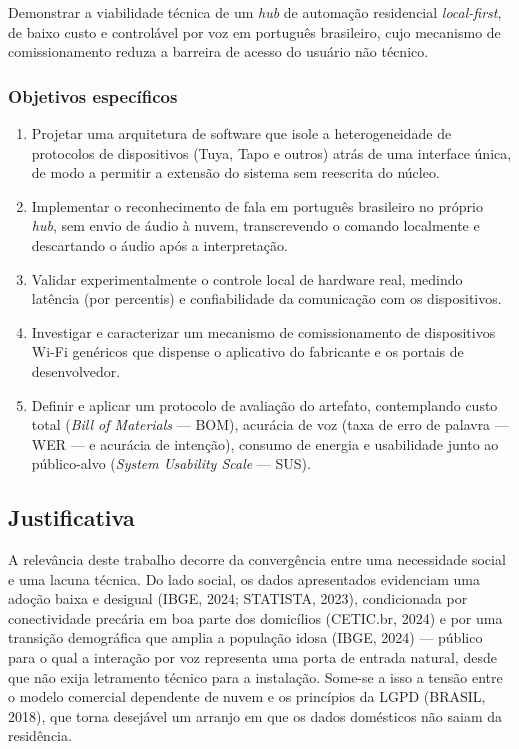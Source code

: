 Demonstrar a viabilidade técnica de um \textit{hub} de automação residencial
\textit{local-first}, de baixo custo e controlável por voz em português brasileiro,
cujo mecanismo de comissionamento reduza a barreira de acesso do usuário não técnico.

\subsubsection{Objetivos específicos}

\begin{enumerate}
  \item Projetar uma arquitetura de software que isole a heterogeneidade de protocolos
        de dispositivos (Tuya, Tapo e outros) atrás de uma interface única, de modo a
        permitir a extensão do sistema sem reescrita do núcleo.
  \item Implementar o reconhecimento de fala em português brasileiro no próprio
        \textit{hub}, sem envio de áudio à nuvem, transcrevendo o comando localmente e
        descartando o áudio após a interpretação.
  \item Validar experimentalmente o controle local de hardware real, medindo latência
        (por percentis) e confiabilidade da comunicação com os dispositivos.
  \item Investigar e caracterizar um mecanismo de comissionamento de dispositivos
        Wi-Fi genéricos que dispense o aplicativo do fabricante e os portais de
        desenvolvedor.
  \item Definir e aplicar um protocolo de avaliação do artefato, contemplando custo
        total (\textit{Bill of Materials} --- BOM), acurácia de voz (taxa de erro de
        palavra --- WER --- e acurácia de intenção), consumo de energia e usabilidade
        junto ao público-alvo (\textit{System Usability Scale} --- SUS).
\end{enumerate}

\subsection{Justificativa}

A relevância deste trabalho decorre da convergência entre uma necessidade social e uma
lacuna técnica. Do lado social, os dados apresentados evidenciam uma adoção baixa e
desigual (IBGE, 2024; STATISTA, 2023), condicionada por conectividade precária em boa
parte dos domicílios (CETIC.br, 2024) e por uma transição demográfica que amplia a
população idosa (IBGE, 2024) --- público para o qual a interação por voz representa uma
porta de entrada natural, desde que não exija letramento técnico para a instalação.
Some-se a isso a tensão entre o modelo comercial dependente de nuvem e os princípios da
LGPD (BRASIL, 2018), que torna desejável um arranjo em que os dados domésticos não
saiam da residência.

